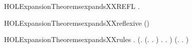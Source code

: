 \newcommand{\HOLExpansionTheoremsexpandsXXPRESDXXBYXXPAR}{\UseVerbatim{HOLExpansionTheoremsexpandsXXPRESDXXBYXXPAR}}
\begin{SaveVerbatim}{HOLExpansionTheoremsexpandsXXREFL}
\HOLTokenTurnstile{} \HOLSymConst{\HOLTokenForall{}}.   
\end{SaveVerbatim}
\newcommand{\HOLExpansionTheoremsexpandsXXREFL}{\UseVerbatim{HOLExpansionTheoremsexpandsXXREFL}}
\begin{SaveVerbatim}{HOLExpansionTheoremsexpandsXXreflexive}
\HOLTokenTurnstile{}  ()
\end{SaveVerbatim}
\newcommand{\HOLExpansionTheoremsexpandsXXreflexive}{\UseVerbatim{HOLExpansionTheoremsexpandsXXreflexive}}
\begin{SaveVerbatim}{HOLExpansionTheoremsexpandsXXrules}
\HOLTokenTurnstile{} \HOLSymConst{\HOLTokenForall{}} .
       (\HOLSymConst{\HOLTokenForall{}}.
            (\HOLSymConst{\HOLTokenForall{}}.
                  \HOLTokenTransBegin{} \HOLTokenTransEnd {} \HOLSymConst{\HOLTokenImp{}}
                 \HOLSymConst{\HOLTokenExists{}}.  \HOLTokenTransBegin{} \HOLTokenTransEnd {} \HOLSymConst{\HOLTokenConj{}}   ) \HOLSymConst{\HOLTokenConj{}}
            \HOLSymConst{\HOLTokenForall{}}.
                 \HOLTokenTransBegin{} \HOLTokenTransEnd {} \HOLSymConst{\HOLTokenImp{}}
                \HOLSymConst{\HOLTokenExists{}}.  \HOLTokenWeakTransBegin{} \HOLTokenWeakTransEnd {} \HOLSymConst{\HOLTokenConj{}}   ) \HOLSymConst{\HOLTokenConj{}}
       (\HOLSymConst{\HOLTokenForall{}}.
             \HOLTokenTransBegin\HOLConst{\ensuremath{\tau}}\HOLTokenTransEnd {} \HOLSymConst{\HOLTokenImp{}}
               \HOLSymConst{\HOLTokenDisj{}} \HOLSymConst{\HOLTokenExists{}}.  \HOLTokenTransBegin\HOLConst{\ensuremath{\tau}}\HOLTokenTransEnd {} \HOLSymConst{\HOLTokenConj{}}   ) \HOLSymConst{\HOLTokenConj{}}

\end{SaveVerbatim}
